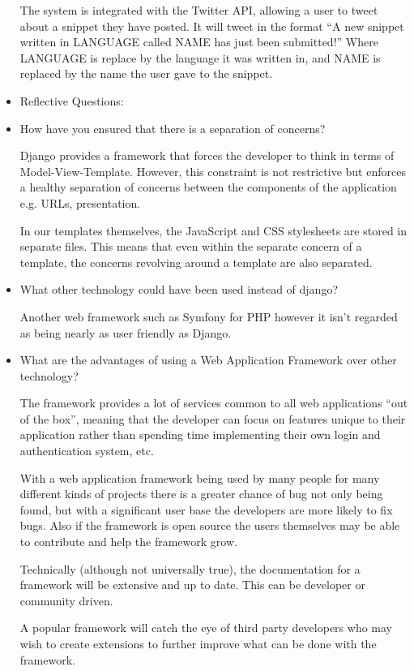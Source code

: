 \documentclass{sig-alt-release2}
\begin{document}
\begin{itemize}
The system is integrated with the Twitter API, allowing a user to
tweet about a snippet they have posted. It will tweet in the format
``A new snippet written in LANGUAGE called NAME has just been submitted!''
Where LANGUAGE is replace by the language it was written in, and NAME
is replaced by the name the user gave to the snippet.

\item	Reflective Questions: 
\item	How have you ensured that there is a separation of concerns?

Django provides a framework that forces the developer to think in terms
of Model-View-Template. However, this constraint is not restrictive but
enforces a healthy separation of concerns between the components of
the application e.g. URLs, presentation.

In our templates themselves, the JavaScript and CSS stylesheets are
stored in separate files. This means that even within the separate concern
of a template, the concerns revolving around a template are also
separated.

\item	What other technology could have been used instead of django?

Another web framework such as Symfony for PHP however it isn't regarded
as being nearly as user friendly as Django.

\item	What are the advantages of using a Web Application Framework
over other technology?

The framework provides a lot of services common to all web applications
``out of the box'', meaning that the developer can focus on features
unique to their application rather than spending time implementing their
own login and authentication system, etc.

With a web application framework being used by many people for many different
kinds of projects there is a greater chance of bug not only being found, but
with a significant user base the developers are more likely to fix bugs. Also
if the framework is open source the users themselves may be able to contribute
and help the framework grow.

Technically (although not universally true), the documentation for a framework
will be extensive and up to date. This can be developer or community driven.

A popular framework will catch the eye of third party developers who may wish
to create extensions to further improve what can be done with the framework.


\end{itemize}
\end{document}
